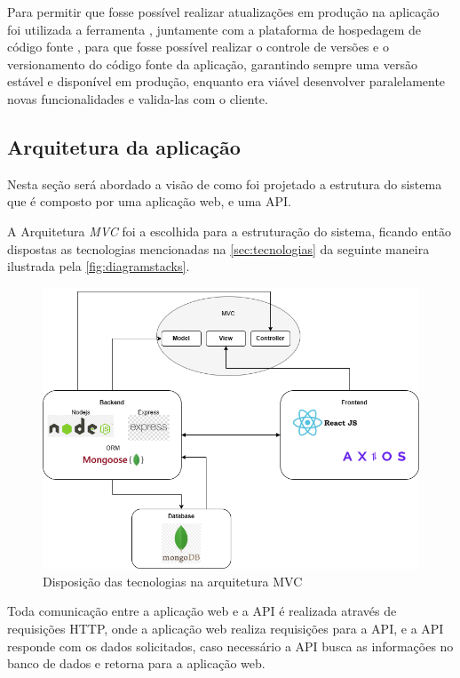 Para permitir que fosse possível realizar atualizações em produção na aplicação foi utilizada a ferramenta , juntamente com a plataforma de hospedagem de código fonte , para que fosse possível realizar o controle de versões e o versionamento do código fonte da aplicação, garantindo sempre uma versão estável e disponível em produção, enquanto era viável desenvolver paralelamente novas funcionalidades e valida-las com o cliente.

\subsection{Arquitetura da aplicação}
Nesta seção será abordado a visão de como foi projetado a estrutura do sistema que é composto por uma aplicação web, e uma API.

A Arquitetura \textit{MVC} foi a escolhida para a estruturação do sistema, ficando então dispostas as tecnologias mencionadas na \autoref{sec:tecnologias} da seguinte maneira ilustrada pela  \autoref{fig:diagramstacks}.

\begin{figure}[htb]
    \caption{\label{fig:diagramstacks}Disposição das tecnologias na arquitetura MVC}
    \begin{center}
        \includegraphics[scale=0.5]{imagens/diagrama.png}
    \end{center}
\end{figure}


Toda comunicação entre a aplicação web e a API é realizada através de requisições HTTP, onde a aplicação web realiza requisições para a API, e a API responde com os dados solicitados, caso necessário a API busca as informações no banco de dados e retorna para a aplicação web.

